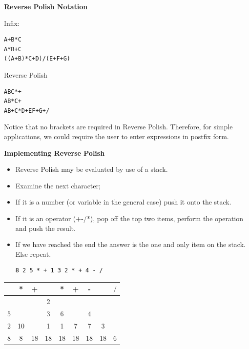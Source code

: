 \documentclass[a4,portraitt]{slides}
\begin{document}
{\newpage
{\samepage
\begin{center}
{\Large{\bf Reverse Polish Notation}}
\end{center}

Infix:
\begin{verbatim}
A+B*C
A*B+C
((A+B)*C+D)/(E+F+G)
\end{verbatim}

Reverse Polish
\begin{verbatim}
ABC*+
AB*C+
AB+C*D+EF+G+/
\end{verbatim}

Notice that no brackets are required in Reverse Polish. Therefore,
for simple applications, we could require the user to enter expressions
in postfix form.
}

\newpage
{\samepage
\begin{center}
{\Large{\bf Implementing Reverse Polish}}
\end{center}
\begin{itemize}
\item Reverse Polish may be evaluated by use of a stack.
\item Examine the next character;
\item If it is a number (or variable in the general case)
push it onto the stack.
\item If it is an operator (+-/*), pop off the top two
items, perform the operation and push the result.
\item If we have reached the end the answer is the one and only
item on the stack. Else repeat.
\begin{verbatim}
8 2 5 * + 1 3 2 * + 4 - /
\end{verbatim}
\end{itemize}

\begin{center}
\begin{tabular}{|c|c|c|c|c|c|c|c|c|}\hline
   & * & + &   & * & + & - &   & $/$ \\ \hline
   &   &   & 2 &   &   &   &   &     \\
 5 &   &   & 3 & 6 &   & 4 &   &     \\
 2 & 10&   & 1 & 1 & 7 & 7 & 3 &     \\
 8 & 8 & 18& 18& 18& 18& 18& 18& 6   \\ \hline
\end{tabular}
\end{center}
}

}
\end{document}

